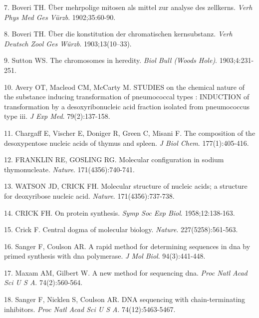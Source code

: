 \documentclass[11pt,letterpaper]{book}
\begin{document}
\leavevmode\hypertarget{ref-boveri:1902aa}{}%
7. Boveri TH. Über mehrpolige mitosen als mittel zur analyse des zellkerns. \emph{Verh Phys Med Ges Vürzb}. 1902;35:60-90.

\leavevmode\hypertarget{ref-boveri:1903aa}{}%
8. Boveri TH. Über die konstitution der chromatischen kernsubstanz. \emph{Verh Deutsch Zool Ges Würzb}. 1903;13(10--33).

\leavevmode\hypertarget{ref-sutton:1903aa}{}%
9. Sutton WS. The chromosomes in heredity. \emph{Biol Bull (Woods Hole)}. 1903;4:231-251.

\leavevmode\hypertarget{ref-avery:1944aa}{}%
10. Avery OT, Macleod CM, McCarty M. STUDIES on the chemical nature of the substance inducing transformation of pneumococcal types : INDUCTION of transformation by a desoxyribonucleic acid fraction isolated from pneumococcus type iii. \emph{J Exp Med}. 79(2):137-158.

\leavevmode\hypertarget{ref-chargaff:1949aa}{}%
11. Chargaff E, Vischer E, Doniger R, Green C, Misani F. The composition of the desoxypentose nucleic acids of thymus and spleen. \emph{J Biol Chem}. 177(1):405-416.

\leavevmode\hypertarget{ref-franklin:1953aa}{}%
12. FRANKLIN RE, GOSLING RG. Molecular configuration in sodium thymonucleate. \emph{Nature}. 171(4356):740-741.

\leavevmode\hypertarget{ref-watson:1953aa}{}%
13. WATSON JD, CRICK FH. Molecular structure of nucleic acids; a structure for deoxyribose nucleic acid. \emph{Nature}. 171(4356):737-738.

\leavevmode\hypertarget{ref-crick:1958aa}{}%
14. CRICK FH. On protein synthesis. \emph{Symp Soc Exp Biol}. 1958;12:138-163.

\leavevmode\hypertarget{ref-crick:1970aa}{}%
15. Crick F. Central dogma of molecular biology. \emph{Nature}. 227(5258):561-563.

\leavevmode\hypertarget{ref-sanger:1975aa}{}%
16. Sanger F, Coulson AR. A rapid method for determining sequences in dna by primed synthesis with dna polymerase. \emph{J Mol Biol}. 94(3):441-448.

\leavevmode\hypertarget{ref-maxam:1977aa}{}%
17. Maxam AM, Gilbert W. A new method for sequencing dna. \emph{Proc Natl Acad Sci U S A}. 74(2):560-564.

\leavevmode\hypertarget{ref-sanger:1977aa}{}%
18. Sanger F, Nicklen S, Coulson AR. DNA sequencing with chain-terminating inhibitors. \emph{Proc Natl Acad Sci U S A}. 74(12):5463-5467.
\end{document}
